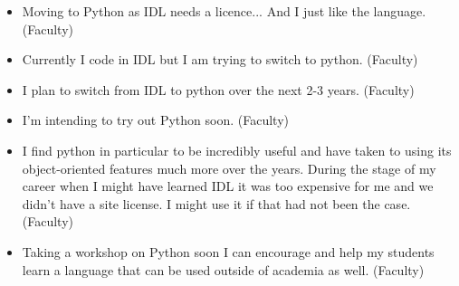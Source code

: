 \begin{itemize}
\item{Moving to Python as IDL needs a licence... And I just like the language. (Faculty)}
\item{Currently I code in IDL but I am trying to switch to python. (Faculty)}
\item{I plan to switch from IDL to python over the next 2-3 years. (Faculty)}
\item{I'm intending to try out Python soon. (Faculty)}
\item{I find python in particular to be incredibly useful and have taken to using its object-oriented features much more over the years.  During the stage of my career when I might have learned IDL it was too expensive for me and we didn't have a site license.  I might use it if that had not been the case. (Faculty)}
\item{Taking a workshop on Python soon I can encourage and help my students learn a language that can be used outside of academia as well. (Faculty)}
\end{itemize}

